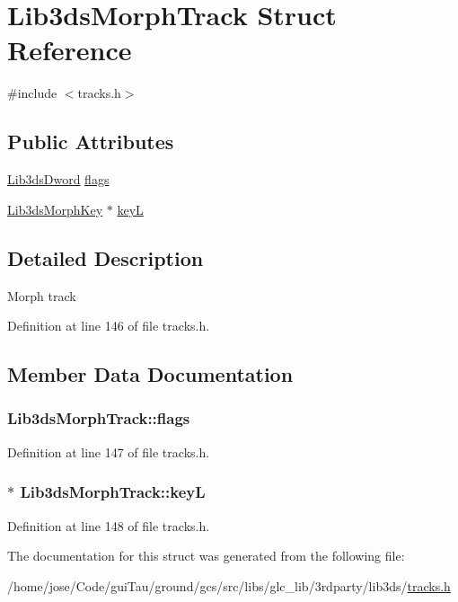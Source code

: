 \hypertarget{struct_lib3ds_morph_track}{\section{Lib3ds\-Morph\-Track Struct Reference}
\label{struct_lib3ds_morph_track}
}


{\ttfamily \#include $<$tracks.\-h$>$}

\subsection*{Public Attributes}
\begin{DoxyCompactItemize}
\item 
\hyperlink{types_8h_a299c9663303144c562f6bd92c2f273d3}{Lib3ds\-Dword} \hyperlink{struct_lib3ds_morph_track_a02b1c7494c5f3ba4f418cc13c6e143b7}{flags}
\item 
\hyperlink{struct_lib3ds_morph_key}{Lib3ds\-Morph\-Key} $\ast$ \hyperlink{struct_lib3ds_morph_track_a480366e0b29a4284e62673f9a4c9134a}{key\-L}
\end{DoxyCompactItemize}


\subsection{Detailed Description}
Morph track 

Definition at line 146 of file tracks.\-h.



\subsection{Member Data Documentation}
\hypertarget{struct_lib3ds_morph_track_a02b1c7494c5f3ba4f418cc13c6e143b7}{
\subsubsection[{flags}]{ Lib3ds\-Morph\-Track\-::flags}}\label{struct_lib3ds_morph_track_a02b1c7494c5f3ba4f418cc13c6e143b7}


Definition at line 147 of file tracks.\-h.

\hypertarget{struct_lib3ds_morph_track_a480366e0b29a4284e62673f9a4c9134a}{
\subsubsection[{key\-L}]{$\ast$ Lib3ds\-Morph\-Track\-::key\-L}}\label{struct_lib3ds_morph_track_a480366e0b29a4284e62673f9a4c9134a}


Definition at line 148 of file tracks.\-h.



The documentation for this struct was generated from the following file\-:\begin{DoxyCompactItemize}
\item 
/home/jose/\-Code/gui\-Tau/ground/gcs/src/libs/glc\-\_\-lib/3rdparty/lib3ds/\hyperlink{tracks_8h}{tracks.\-h}\end{DoxyCompactItemize}
